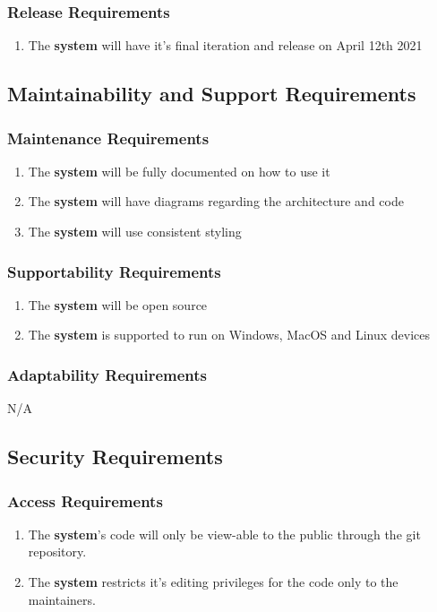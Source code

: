 \documentclass[12pt, titlepage]{article}
\begin{document}
    \subsubsection{Release Requirements}
        \begin{enumerate}
            \item The \textbf{system} will have it's final iteration and release on April 12th 2021
        \end{enumerate}
\subsection{Maintainability and Support Requirements}
    \subsubsection{Maintenance Requirements}
        \begin{enumerate}
            \item The \textbf{system} will be fully documented on how to use it
            \item The \textbf{system} will have diagrams regarding the architecture and code
            \item The \textbf{system} will use consistent styling
        \end{enumerate}
    \subsubsection{Supportability Requirements}
        \begin{enumerate}
            \item The \textbf{system} will be open source
            \item The \textbf{system} is supported to run on Windows, MacOS and Linux devices
        \end{enumerate}
    \subsubsection{Adaptability Requirements}
        N/A

\subsection{Security Requirements}
    \subsubsection{Access Requirements}
        \begin{enumerate}
            \item The \textbf{system}'s code will only be view-able to the public through the git repository. 
            \item The \textbf{system} restricts it's editing privileges for the code only to the maintainers. 
        \end{enumerate}
\end{document}
